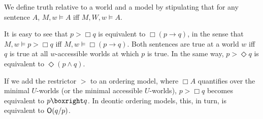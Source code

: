 We define truth relative to a world and a model by stipulating that for any sentence $A$, $M,w
\models A$ iff $M,W,w \models A$.

It is easy to see that $p > \Box q$ is equivalent to $\Box(p \to q)$, in the
sense that $M,w \models p > \Box q$ iff $M,w \models \Box(p \to q)$. Both
sentences are true at a world $w$ iff $q$ is true at all $w$-accessible worlds
at which $p$ is true.
In the same way, $p > \Diamond q$ is equivalent to $\Diamond(p \land q)$.

If we add the restrictor $>$ to an ordering model, where $\Box A$ quantifies
over the minimal $U$-worlds (or the minimal accessible $U$-worlds), $p > \Box q$
becomes equivalent to $p \boxright q$. In deontic ordering models, this, in
turn, is equivalent to $\operatorname{\mathsf{O}}(q/p)$.



\fi

